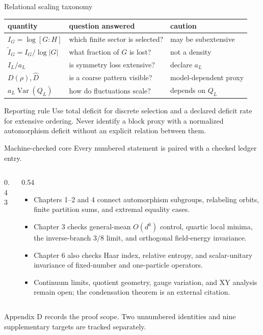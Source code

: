 \begin{frame}{Relational scaling taxonomy}
  \small
  \begin{center}
    \begin{tabular}{lll}
      \toprule
      quantity & question answered & caution \\
      \midrule
      $I_G=\log[G:H]$ & which finite sector is selected? & may be subextensive \\
      $\widetilde I_G=I_G/\log|G|$ & what fraction of $G$ is lost? & not a density \\
      $I_L/a_L$ & is symmetry loss extensive? & declare $a_L$ \\
      $D(\rho),\widehat D$ & is a coarse pattern visible? & model-dependent proxy \\
      $a_L\operatorname{Var}(Q_L)$ & how do fluctuations scale? & depends on $Q_L$ \\
      \bottomrule
    \end{tabular}
  \end{center}

  \begin{block}{Reporting rule}
    Use total deficit for discrete selection and a declared deficit rate for
    extensive ordering. Never identify a block proxy with a normalized
    automorphism deficit without an explicit relation between them.
  \end{block}
\end{frame}

\begin{frame}{Machine-checked core}
  \footnotesize
  Every numbered statement is paired with a checked ledger entry.

  \begin{columns}[T,onlytextwidth]
  \begin{column}{0.43\textwidth}
    \scriptsize
    
  \end{column}
  \begin{column}{0.54\textwidth}
  \begin{itemize}
    \item Chapters 1--2 and 4 connect automorphism subgroups, relabeling orbits,
      finite partition sums, and extremal equality cases.
    \item Chapter 3 checks general-mean $O(d^6)$ control, quartic local minima,
      the inverse-branch $3/8$ limit, and orthogonal field-energy invariance.
    \item Chapter 6 also checks Haar index, relative entropy, and scalar-unitary
      invariance of fixed-number and one-particle operators.
    \item Continuum limits, quotient geometry, gauge variation, and XY analysis
      remain open; the condensation theorem is an external citation.
  \end{itemize}
  \end{column}
  \end{columns}

  \medskip
  Appendix D records the proof scope. Two unnumbered identities and nine
  supplementary targets are tracked separately.
\end{frame}
